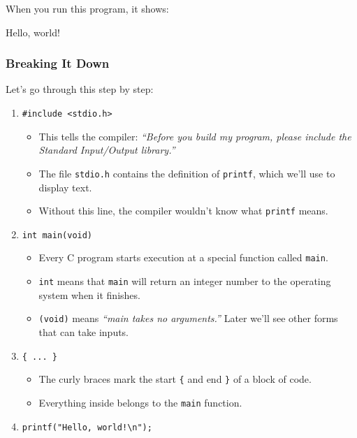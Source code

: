 \documentclass[
  letterpaper,
  DIV=11,
  numbers=noendperiod]{scrreprt}
\newenvironment{Shaded}{\begin{snugshade}}{\end{snugshade}}
\newcommand{\ExtensionTok}[1]{\textcolor[rgb]{0.00,0.23,0.31}{#1}}
\newcommand{\NormalTok}[1]{\textcolor[rgb]{0.00,0.23,0.31}{#1}}
\providecommand{\tightlist}{%
  \setlength{\itemsep}{0pt}\setlength{\parskip}{0pt}}
\begin{document}
When you run this program, it shows:

\begin{Shaded}
\begin{Highlighting}[]
\ExtensionTok{Hello,}\NormalTok{ world!}
\end{Highlighting}
\end{Shaded}

\subsubsection{Breaking It Down}\label{breaking-it-down}

Let's go through this step by step:

\begin{enumerate}
\def\labelenumi{\arabic{enumi}.}
\item
  \texttt{\#include\ \textless{}stdio.h\textgreater{}}

  \begin{itemize}
  \tightlist
  \item
    This tells the compiler: \emph{``Before you build my program, please
    include the Standard Input/Output library.''}
  \item
    The file \texttt{stdio.h} contains the definition of
    \texttt{printf}, which we'll use to display text.
  \item
    Without this line, the compiler wouldn't know what \texttt{printf}
    means.
  \end{itemize}
\item
  \texttt{int\ main(void)}

  \begin{itemize}
  \tightlist
  \item
    Every C program starts execution at a special function called
    \texttt{main}.
  \item
    \texttt{int} means that \texttt{main} will return an integer number
    to the operating system when it finishes.
  \item
    \texttt{(void)} means \emph{``main takes no arguments.''} Later
    we'll see other forms that can take inputs.
  \end{itemize}
\item
  \texttt{\{\ ...\ \}}

  \begin{itemize}
  \tightlist
  \item
    The curly braces mark the start \texttt{\{} and end \texttt{\}} of a
    block of code.
  \item
    Everything inside belongs to the \texttt{main} function.
  \end{itemize}
\item
  \texttt{printf("Hello,\ world!\textbackslash{}n");}


\end{enumerate}
\end{document}
